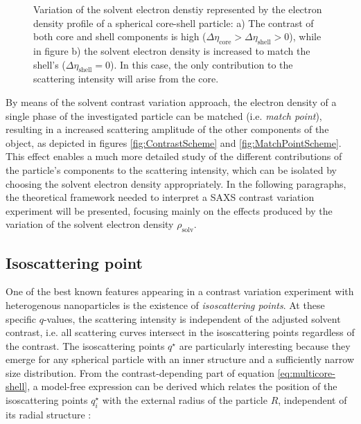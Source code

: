 \begin{figure}%
	\centering
	\caption{Variation of the solvent electron denstiy represented by the electron density profile of a spherical core-shell particle: a) The contrast of both core and shell components is high ($\Delta\eta_{\text{core}} > \Delta\eta_{\text{shell}} > 0$), while in figure b) the solvent electron density is increased to match the shell's ($\Delta\eta_{\text{shell}} = 0$). In this case, the only contribution to the scattering intensity will arise from the core.}
\end{figure}


By means of the solvent contrast variation approach, the electron density of a single phase of the investigated particle can be matched (i.e. \emph{match point}), resulting in a increased scattering amplitude of the other components of the object, as depicted in figures \ref{fig:ContrastScheme} and \ref{fig:MatchPointScheme}. This effect enables a much more detailed study of the different contributions of the particle's components to the scattering intensity, which can be isolated by choosing the solvent electron density appropriately. In the following paragraphs, the theoretical framework needed to interpret a SAXS contrast variation experiment will be presented, focusing mainly on the effects produced by the variation of the solvent electron density $\rho_{\text{solv}}$.

 
\subsection{Isoscattering point}
One of the best known features appearing in a contrast variation experiment with heterogenous nanoparticles is the existence of \emph{isoscattering points}. At these specific \( q\)-values, the scattering intensity is independent of the adjusted solvent contrast, i.e. all scattering curves intersect in the isoscattering points regardless of the contrast. The isoscattering points \(q^{\star}\) are particularly interesting because they emerge for any spherical particle with an inner structure and a sufficiently narrow size distribution. From the contrast-depending part of equation \eqref{eq:multicore-shell}, a model-free expression can be derived which relates the position of the isoscattering points \(q^{\star}_i\) with the external radius of the particle \( R \), independent of its radial structure \citep{kawaguchi_isoscattering_1992}:

